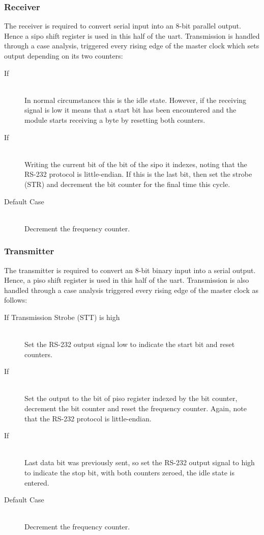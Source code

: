 \subsubsection{Receiver}

The receiver is required to convert serial input into an 8-bit parallel output.
Hence a \gls{sipo} shift register is used in this half of the \gls{uart}.
Transmission is handled through a case analysis, triggered every rising edge of
the master clock which sets output depending on its two counters:
\begin{description}
\item[If ] \hfill \\
  In normal circumstances this is the idle state. However, if the receiving signal is
  low it means that a start bit has been encountered and the module starts receiving
  a byte by resetting both counters.
\item[If ] \hfill \\
  Writing the current bit of the bit of the \gls{sipo} it indexes, noting that the
  RS-232 protocol is little-endian. If this is the last bit, then set the strobe (STR)
  and decrement the bit counter for the final time this cycle.
\item[Default Case] \hfill \\
  Decrement the frequency counter.
\end{description}

\subsubsection{Transmitter}

The transmitter is required to convert an 8-bit binary input into a serial output.
Hence, a \gls{piso} shift register is used in this half of the \gls{uart}.
Transmission is also handled through a case analysis triggered every rising edge of
the master clock as follows:
\begin{description}
\item[If Transmission Strobe (STT) is high] \hfill \\
  Set the RS-232 output signal low to indicate the start bit and reset counters.
\item[If ] \hfill \\
  Set the output to the bit of \gls{piso} register indexed by the bit counter,
  decrement the bit counter and reset the frequency counter. Again, note that the
  RS-232 protocol is little-endian.
\item[If ] \hfill \\
  Last data bit was previously sent, so set the RS-232 output signal to high
  to indicate the stop bit, with both counters zeroed, the idle state is entered.
\item[Default Case] \hfill \\
  Decrement the frequency counter.
\end{description}

